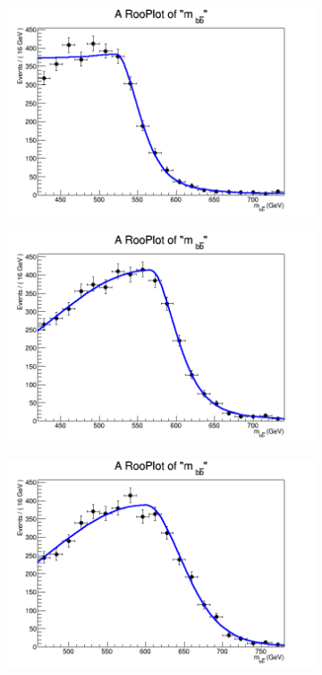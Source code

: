 \begin{figure}[phtb!]
\begin{center}
  \begin{subfigure}[$m_{A}=550$ GeV]{0.4\textwidth}\includegraphics[width=\textwidth]{FitResults/images/fitMC_bAbb550_2.png}\end{subfigure}
  \begin{subfigure}[$m_{A}=600$ GeV]{0.4\textwidth}\includegraphics[width=\textwidth]{FitResults/images/fitMC_bAbb600_2.png}\end{subfigure}
  \begin{subfigure}[$m_{A}=650$ GeV]{0.4\textwidth}\includegraphics[width=\textwidth]{FitResults/images/fitMC_bAbb650_2.png}\end{subfigure}

\end{center}
\end{figure}
